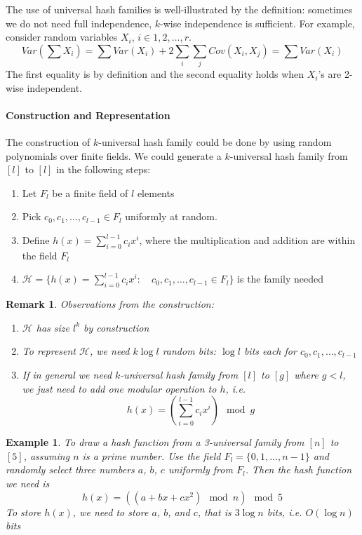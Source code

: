 \documentclass[11pt]{article}
\theoremstyle{plain}
\newtheorem{example}[theorem]{Example}
\newtheorem{remark}[theorem]{Remark}
\begin{document}
The use of universal hash families is well-illustrated by the definition: 
sometimes we do not need full independence, $k$-wise independence is 
sufficient. For example, consider random variables $X_i$, $i\in{1,2,\dots,r}$. 
\[
Var(\sum X_i)=\sum Var(X_i)+2\sum_i\sum_j Cov(X_i, X_j)=\sum Var(X_i)
\]
The first equality is by definition and the second equality holds when $X_i$'s 
are 2-wise independent. 

\paragraph{Construction and Representation}
The construction of $k$-universal hash family could be done by using 
random polynomials over finite fields. We could generate a $k$-universal 
hash family from $[l]$ to $[l]$ in the following steps: 
\begin{enumerate}
	\item Let $F_l$ be a finite field of $l$ elements
	\item Pick $c_0, c_1, \dots, c_{l-1}\in F_l$ uniformly at random. 
	\item Define $h(x)=\sum_{i=0}^{l-1}c_ix^i$, where the multiplication and 
	addition are within the field $F_l$
	\item $\mathcal{H}=\{h(x)=\sum_{i=0}^{l-1}c_ix^i: \quad c_0, c_1,\dots, 
	c_{l-1}\in F_l\}$ is the family needed
\end{enumerate}
\begin{remark} Observations from the construction:
	\begin{enumerate} 
		\item $\mathcal{H}$ has size $l^k$ by construction
		\item To represent $\mathcal{H}$, we need $k\log l$ random bits: $\log 
		l$ bits each for $c_0, c_1, \dots, c_{l-1}$
		\item If in general we need $k$-universal hash family from $[l]$ to $[g]$ 
		where $g<l$, we just need to add one modular operation to $h$, i.e. 
		\[
		h(x)=(\sum_{i=0}^{l-1}c_ix^i) \mod g 
		\]
	\end{enumerate}
\end{remark}
\begin{example}
	To draw a hash function from a 3-universal family from $[n]$ to $[5]$, 
	assuming $n$ is a prime number. Use the field $F_l=\{0,1,\dots, n-1\}$ and 
	randomly select three numbers $a$, $b$, $c$ uniformly from $F_l$. Then 
	the hash function we need is 
	\[
	h(x)=((a+bx+cx^2)\mod n) \mod 5
	\]
	To store $h(x)$, we need to store $a$, $b$, and $c$, that is $3\log n$ 
	bits, i.e. $O(\log n)$ bits
\end{example}
\end{document}
